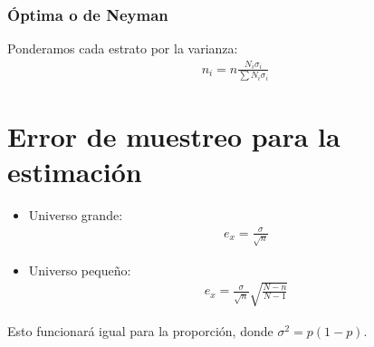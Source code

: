 \documentclass{article}
\begin{document}
\subsubsection{Óptima o de Neyman}
Ponderamos cada estrato por la varianza:
\begin{equation}
    \begin{split}
        n_{i} = n \frac{N_{i}\sigma _{i}}{\sum N_{i}\sigma _{i}}
    \end{split}
\end{equation}
\section{Error de muestreo para la estimación}
\begin{itemize}
    \item Universo grande:
    \begin{equation}
        \begin{split}
            e_{x} = \frac{\sigma }{\sqrt{n}}
        \end{split}
    \end{equation}
    \item Universo pequeño:
    \begin{equation}
        \begin{split}
            e_{x} = \frac{\sigma }{\sqrt{n}} \sqrt{\frac{N-n}{N-1}}
        \end{split}
    \end{equation}
\end{itemize}
Esto funcionará igual para la proporción, donde $\sigma^{2} = p(1-p)$.
\end{document}
